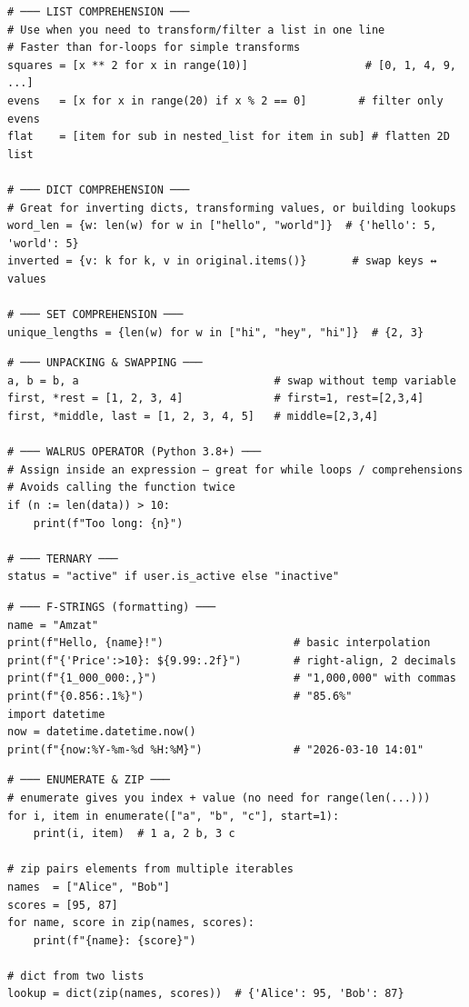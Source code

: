 \documentclass[10pt, a4paper]{article}
\begin{document}
\begin{lstlisting}[language=mypython]
# ─── LIST COMPREHENSION ───
# Use when you need to transform/filter a list in one line
# Faster than for-loops for simple transforms
squares = [x ** 2 for x in range(10)]                  # [0, 1, 4, 9, ...]
evens   = [x for x in range(20) if x % 2 == 0]        # filter only evens
flat    = [item for sub in nested_list for item in sub] # flatten 2D list

# ─── DICT COMPREHENSION ───
# Great for inverting dicts, transforming values, or building lookups
word_len = {w: len(w) for w in ["hello", "world"]}  # {'hello': 5, 'world': 5}
inverted = {v: k for k, v in original.items()}       # swap keys ↔ values

# ─── SET COMPREHENSION ───
unique_lengths = {len(w) for w in ["hi", "hey", "hi"]}  # {2, 3}
\end{lstlisting}


\begin{lstlisting}[language=mypython]
# ─── UNPACKING & SWAPPING ───
a, b = b, a                              # swap without temp variable
first, *rest = [1, 2, 3, 4]              # first=1, rest=[2,3,4]
first, *middle, last = [1, 2, 3, 4, 5]   # middle=[2,3,4]

# ─── WALRUS OPERATOR (Python 3.8+) ───
# Assign inside an expression — great for while loops / comprehensions
# Avoids calling the function twice
if (n := len(data)) > 10:
    print(f"Too long: {n}")

# ─── TERNARY ───
status = "active" if user.is_active else "inactive"
\end{lstlisting}


\begin{lstlisting}[language=mypython]
# ─── F-STRINGS (formatting) ───
name = "Amzat"
print(f"Hello, {name}!")                    # basic interpolation
print(f"{'Price':>10}: ${9.99:.2f}")        # right-align, 2 decimals
print(f"{1_000_000:,}")                     # "1,000,000" with commas
print(f"{0.856:.1%}")                       # "85.6%"
import datetime
now = datetime.datetime.now()
print(f"{now:%Y-%m-%d %H:%M}")              # "2026-03-10 14:01"
\end{lstlisting}


\begin{lstlisting}[language=mypython]
# ─── ENUMERATE & ZIP ───
# enumerate gives you index + value (no need for range(len(...)))
for i, item in enumerate(["a", "b", "c"], start=1):
    print(i, item)  # 1 a, 2 b, 3 c

# zip pairs elements from multiple iterables
names  = ["Alice", "Bob"]
scores = [95, 87]
for name, score in zip(names, scores):
    print(f"{name}: {score}")

# dict from two lists
lookup = dict(zip(names, scores))  # {'Alice': 95, 'Bob': 87}
\end{lstlisting}
\end{document}
